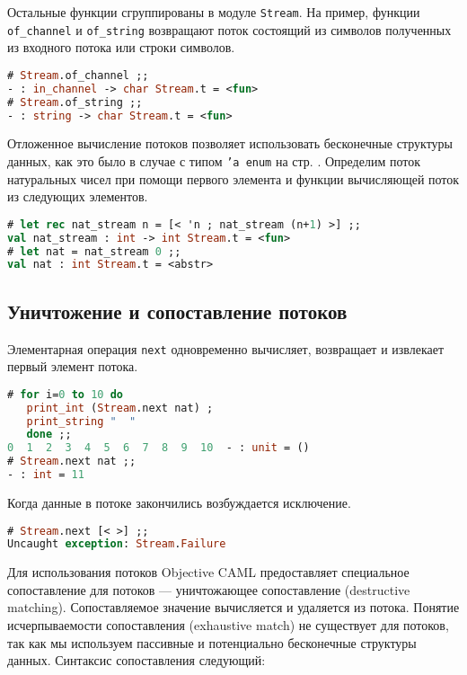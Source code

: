 Остальные функции сгруппированы в модуле \texttt{Stream}. На пример, функции
\texttt{of\_channel} и \texttt{of\_string} возвращают поток состоящий из
символов полученных из входного потока или строки символов.

\begin{lstlisting}[language=OCaml]
# Stream.of_channel ;;
- : in_channel -> char Stream.t = <fun>
# Stream.of_string ;;
- : string -> char Stream.t = <fun>
\end{lstlisting}

Отложенное вычисление потоков позволяет использовать бесконечные структуры
данных, как это было в случае с типом \texttt{'a enum} на стр.
\pageref{subsubsec:infinite_data_structures}. Определим поток натуральных чисел
при помощи первого элемента и функции вычисляющей поток из следующих элементов.

\begin{lstlisting}[language=OCaml]
# let rec nat_stream n = [< 'n ; nat_stream (n+1) >] ;;
val nat_stream : int -> int Stream.t = <fun>
# let nat = nat_stream 0 ;;
val nat : int Stream.t = <abstr>
\end{lstlisting}

\subsection{Уничтожение и сопоставление потоков}
\label{subsec:destruction_and_matching_of_streams}

Элементарная операция \texttt{next} одновременно вычисляет, возвращает и
извлекает первый элемент потока.

\begin{lstlisting}[language=OCaml]
# for i=0 to 10 do
   print_int (Stream.next nat) ;
   print_string "  "
   done ;;
0  1  2  3  4  5  6  7  8  9  10  - : unit = ()
# Stream.next nat ;;
- : int = 11
\end{lstlisting}

Когда данные в потоке закончились возбуждается исключение.

\begin{lstlisting}[language=OCaml]
# Stream.next [< >] ;;
Uncaught exception: Stream.Failure
\end{lstlisting}

Для использования потоков Objective CAML предоставляет специальное сопоставление
для потоков --- уничтожающее сопоставление (destructive matching).
Сопоставляемое значение вычисляется и удаляется из потока. Понятие
исчерпываемости сопоставления (exhaustive match) не существует для потоков, так
как мы используем пассивные и потенциально бесконечные структуры данных.
Синтаксис сопоставления следующий:

